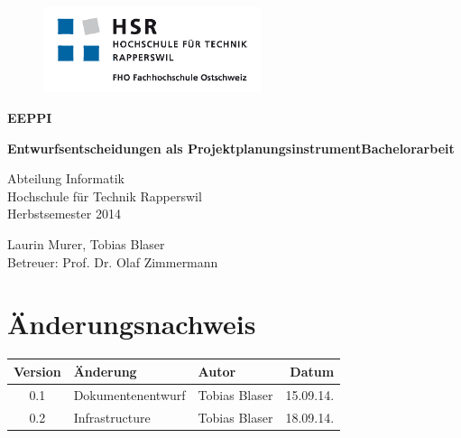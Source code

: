 \documentclass[ngerman,a4paper,12pt]{scrreprt}
\author{Laurin Murer, Tobias Blaser}
\title{\documentType \project}
\date{\today{}, Rapperswil}
\providecommand{\project}{Entwurfsentscheidungen als Projektplanungsinstrument}
\providecommand{\teacher}{Prof. Dr. Olaf Zimmermann}
\providecommand{\versionnumber}{0.2}
\begin{document}
\thispagestyle{empty}
\begin{titlepage}
	\begin{figure}[htp]
		\includegraphics[height=2.5cm]{media/img/logoHSR.png}
	\end{figure}	
	
	\begin{center}

		\vspace*{0.5cm}
		{\fontsize{50}{40} \selectfont \textbf{EEPPI} \\[10mm]}
	
		\vspace*{1cm}	
	
		{\fontsize{28}{40} \selectfont \textbf{\project \newline\newline Bachelorarbeit} \\[10mm]}
	
		{\fontsize{18}{20} \selectfont 
			Abteilung Informatik\\
			Hochschule für Technik Rapperswil \\
				
			\vspace*{1cm}
			Herbstsemester 2014\\
		}
		
		\vspace*{2cm}
		Laurin Murer, Tobias Blaser \\
		Betreuer: \teacher

	\end{center}
\end{titlepage}
\clearpage

%
%
%

\chapter*{Änderungsnachweis}
\begin{tabularx}{\textwidth}{|cXlr|} %
		\hline
		\textbf{Version} & \textbf{Änderung} & \textbf{Autor} & \textbf{Datum}\\
		\hline
		0.1 & Dokumentenentwurf & Tobias Blaser & 15.09.14.\\
		\versionnumber & Infrastructure & Tobias Blaser & 18.09.14.\\
		\hline
\end{tabularx}
\end{document}

